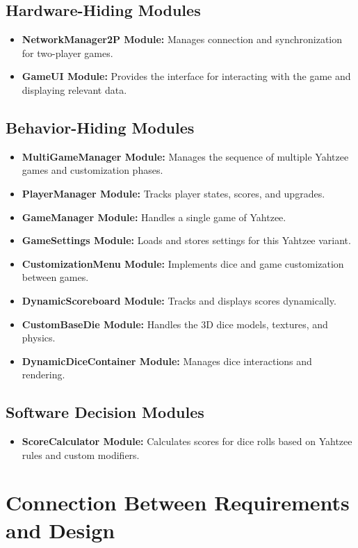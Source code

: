 \documentclass[12pt, titlepage]{article}
\begin{document}
\subsection{Hardware-Hiding Modules}
\begin{itemize}
    \item \textbf{NetworkManager2P Module:} Manages connection and synchronization for two-player games.
    \item \textbf{GameUI Module:} Provides the interface for interacting with the game and displaying relevant data.
\end{itemize}

\subsection{Behavior-Hiding Modules}
\begin{itemize}
    \item \textbf{MultiGameManager Module:} Manages the sequence of multiple Yahtzee games and customization phases.
    \item \textbf{PlayerManager Module:} Tracks player states, scores, and upgrades.
    \item \textbf{GameManager Module:} Handles a single game of Yahtzee.
    \item \textbf{GameSettings Module:} Loads and stores settings for this Yahtzee variant.
    \item \textbf{CustomizationMenu Module:} Implements dice and game customization between games.
    \item \textbf{DynamicScoreboard Module:} Tracks and displays scores dynamically.
    \item \textbf{CustomBaseDie Module:} Handles the 3D dice models, textures, and physics.
    \item \textbf{DynamicDiceContainer Module:} Manages dice interactions and rendering.
\end{itemize}

\subsection{Software Decision Modules}
\begin{itemize}
    \item \textbf{ScoreCalculator Module:} Calculates scores for dice rolls based on Yahtzee rules and custom modifiers.
\end{itemize}

\section{Connection Between Requirements and Design} \label{SecConnection}
\end{document}
